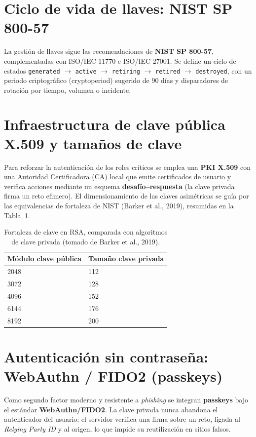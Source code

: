 \documentclass[10pt,letterpaper]{report}
\renewcommand{\_}{\textunderscore\allowbreak}
\begin{document}
\section{Ciclo de vida de llaves: NIST SP 800-57}
La gesti\'on de llaves sigue las recomendaciones de \textbf{NIST SP 800-57},
complementadas con ISO/IEC 11770 e ISO/IEC 27001. Se define un ciclo de estados
\texttt{generated} $\rightarrow$ \texttt{active} $\rightarrow$ \texttt{retiring}
$\rightarrow$ \texttt{retired} $\rightarrow$ \texttt{destroyed}, con un periodo
criptogr\'afico (cryptoperiod) sugerido de 90 d\'ias y disparadores de rotaci\'on
por tiempo, volumen o incidente.

\section{Infraestructura de clave p\'ublica X.509 y tama\~nos de clave}
Para reforzar la autenticaci\'on de los roles cr\'iticos se emplea una
\textbf{PKI X.509} con una Autoridad Certificadora (CA) local que emite
certificados de usuario y verifica acciones mediante un esquema
\textbf{desaf\'io--respuesta} (la clave privada firma un reto efimero). El
dimensionamiento de las claves asim\'etricas se gu\'ia por las equivalencias de
fortaleza de NIST (Barker et al., 2019), resumidas en la Tabla~\ref{tab:rsa}.

\begin{table}[ht]
\centering
\caption{Fortaleza de clave en RSA, comparada con algoritmos de clave privada
(tomado de Barker et al., 2019).}
\label{tab:rsa}
\begin{tabular}{ll}
\toprule
\textbf{M\'odulo clave p\'ublica} & \textbf{Tama\~no clave privada} \\
\midrule
2048 & 112 \\
3072 & 128 \\
4096 & 152 \\
6144 & 176 \\
8192 & 200 \\
\bottomrule
\end{tabular}
\end{table}

\section{Autenticaci\'on sin contrase\~na: WebAuthn / FIDO2 (passkeys)}
Como segundo factor moderno y resistente a \textit{phishing} se integran
\textbf{passkeys} bajo el est\'andar \textbf{WebAuthn/FIDO2}. La clave privada
nunca abandona el autenticador del usuario; el servidor verifica una firma
sobre un reto, ligada al \textit{Relying Party ID} y al origen, lo que impide su
reutilizaci\'on en sitios falsos.
\end{document}
